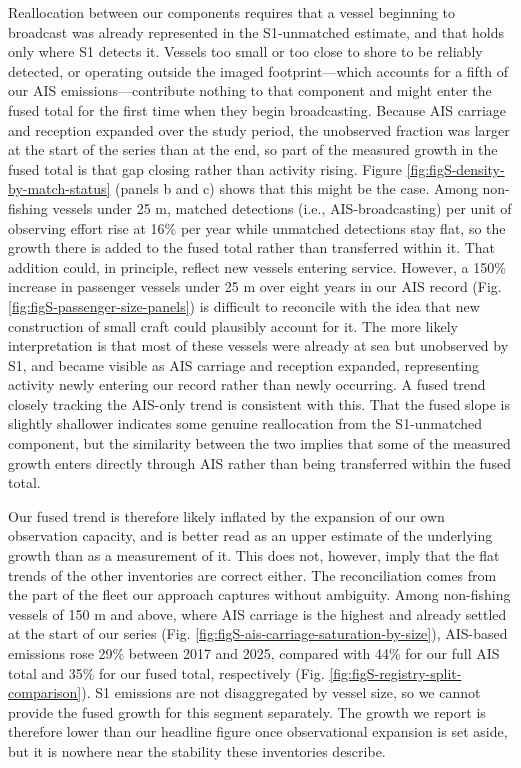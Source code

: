 Reallocation between our components requires that a vessel beginning to broadcast was already represented in the S1-unmatched estimate, and that holds only where S1 detects it. Vessels too small or too close to shore to be reliably detected, or operating outside the imaged footprint—which accounts for a fifth of our AIS emissions—contribute nothing to that component and might enter the fused total for the first time when they begin broadcasting. Because AIS carriage and reception expanded over the study period, the unobserved fraction was larger at the start of the series than at the end, so part of the measured growth in the fused total is that gap closing rather than activity rising. Figure \ref{fig:figS-density-by-match-status} (panels b and c) shows that this might be the case. Among non-fishing vessels under 25 m, matched detections (i.e., AIS-broadcasting) per unit of observing effort rise at 16\% per year while unmatched detections stay flat, so the growth there is added to the fused total rather than transferred within it. That addition could, in principle, reflect new vessels entering service. However, a 150\% increase in passenger vessels under 25 m over eight years in our AIS record (Fig. \ref{fig:figS-passenger-size-panels}) is difficult to reconcile with the idea that new construction of small craft could plausibly account for it. The more likely interpretation is that most of these vessels were already at sea but unobserved by S1, and became visible as AIS carriage and reception expanded, representing activity newly entering our record rather than newly occurring. A fused trend closely tracking the AIS-only trend is consistent with this. That the fused slope is slightly shallower indicates some genuine reallocation from the S1-unmatched component, but the similarity between the two implies that some of the measured growth enters directly through AIS rather than being transferred within the fused total.

Our fused trend is therefore likely inflated by the expansion of our own observation capacity, and is better read as an upper estimate of the underlying growth than as a measurement of it. This does not, however, imply that the flat trends of the other inventories are correct either. The reconciliation comes from the part of the fleet our approach captures without ambiguity. Among non-fishing vessels of 150 m and above, where AIS carriage is the highest and already settled at the start of our series (Fig. \ref{fig:figS-ais-carriage-saturation-by-size}), AIS-based emissions rose 29\% between 2017 and 2025, compared with 44\% for our full AIS total and 35\% for our fused total, respectively (Fig. \ref{fig:figS-registry-split-comparison}). S1 emissions are not disaggregated by vessel size, so we cannot provide the fused growth for this segment separately. The growth we report is therefore lower than our headline figure once observational expansion is set aside, but it is nowhere near the stability these inventories describe.

